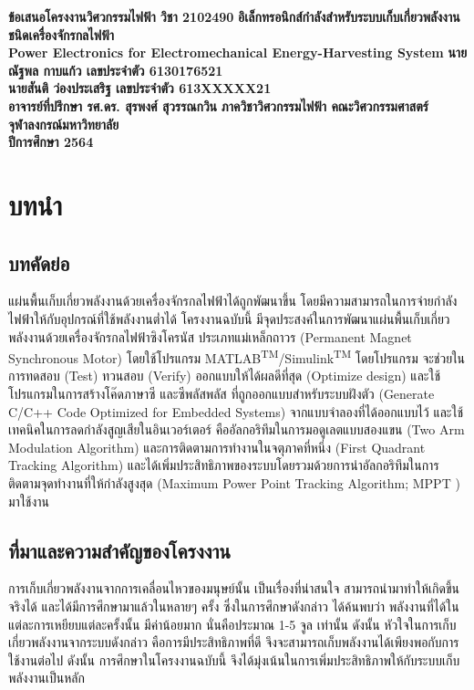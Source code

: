 \documentclass[11pt,a4paper]{article}
\begin{document}
\thispagestyle{empty}
\begin{center}
    \doublespacing
    {\LARGE \bf ข้อเสนอโครงงานวิศวกรรมไฟฟ้า วิชา 2102490}
    \vfill
    {
        \LARGE \bf
        อิเล็กทรอนิกส์กำลังสำหรับระบบเก็บเกี่ยวพลังงานชนิดเครื่องจักรกลไฟฟ้า \\[2ex]
        Power Electronics for Electromechanical Energy-Harvesting System
    }
    \vfill
    {\LARGE \bf นายณัฐพล กาบแก้ว เลขประจำตัว 6130176521}\\[2ex]
    {\LARGE \bf นายสันติ ว่องประเสริฐ เลขประจำตัว 613XXXXX21}\\[2ex]
    {\LARGE \bf อาจารย์ที่ปรึกษา รศ.ดร. สุรพงศ์ สุวรรณกวิน}
    \vfill
    {\LARGE \bf ภาควิชาวิศวกรรมไฟฟ้า คณะวิศวกรรมศาสตร์}\\[2ex]
    {\LARGE \bf จุฬาลงกรณ์มหาวิทยาลัย}\\[2ex]
    {\LARGE \bf ปีการศึกษา 2564}
\end{center}

\newpage
\thispagestyle{empty}
\tableofcontents

\newpage
\setcounter{page}{1}
\section{บทนำ}
\subsection{บทคัดย่อ}
แผ่นพื้นเก็บเกี่ยวพลังงานด้วยเครื่องจักรกลไฟฟ้าได้ถูกพัฒนาขึ้น โดยมีความสามารถในการจ่ายกำลังไฟฟ้าให้กับอุปกรณ์ที่ใช้พลังงานต่ำได้ โครงงานฉบับนี้ มีจุดประสงค์ในการพัฒนาแผ่นพื้นเก็บเกี่ยวพลังงานด้วยเครื่องจักรกลไฟฟ้าซิงโครนัส ประเภทแม่เหล็กถาวร (Permanent Magnet Synchronous Motor) โดยใช้โปรแกรม MATLAB\textsuperscript{TM}/Simulink\textsuperscript{TM} โดยโปรแกรม จะช่วยในการทดสอบ (Test) ทวนสอบ (Verify) ออกแบบให้ได้ผลดีที่สุด (Optimize design) และใช้โปรแกรมในการสร้างโค๊ดภาษาซี และซีพลัสพลัส ที่ถูกออกแบบสำหรับระบบฝังตัว (Generate C/C++ Code Optimized for Embedded Systems)  จากแบบจำลองที่ได้ออกแบบไว้ และใช้เทคนิคในการลดกำลังสูญเสียในอินเวอร์เตอร์ คืออัลกอริทึมในการมอดูเลตแบบสองแขน (Two Arm Modulation Algorithm) และการติดตามการทำงานในจตุภาคที่หนึ่ง (First Quadrant Tracking Algorithm) และได้เพิ่มประสิทธิภาพของระบบโดยรวมด้วยการนำอัลกอริทึมในการติดตามจุดทำงานที่ให้กำลังสูงสุด (Maximum Power Point Tracking Algorithm; MPPT ) มาใช้งาน

\subsection{ที่มาและความสำคัญของโครงงาน}
การเก็บเกี่ยวพลังงานจากการเคลื่อนไหวของมนุษย์นั้น เป็นเรื่องที่น่าสนใจ สามารถนำมาทำให้เกิดขึ้นจริงได้ และได้มีการศึกษามาแล้วในหลายๆ ครั้ง \cite{biomech} \cite{GpH:01} ซึ่งในการศึกษาดังกล่าว ได้ค้นพบว่า พลังงานที่ได้ในแต่ละการเหยียบแต่ละครั้งนั้น มีค่าน้อยมาก นั่นคือประมาณ 1-5 จูล เท่านั้น ดังนั้น หัวใจในการเก็บเกี่ยวพลังงานจากระบบดังกล่าว คือการมีประสิทธิภาพที่ดี จึงจะสามารถเก็บพลังงานได้เพียงพอกับการใช้งานต่อไป ดังนั้น การศึกษาในโครงงานฉบับนี้ จึงได้มุ่งเน้นในการเพิ่มประสิทธิภาพให้กับระบบเก็บพลังงานเป็นหลัก
\end{document}
